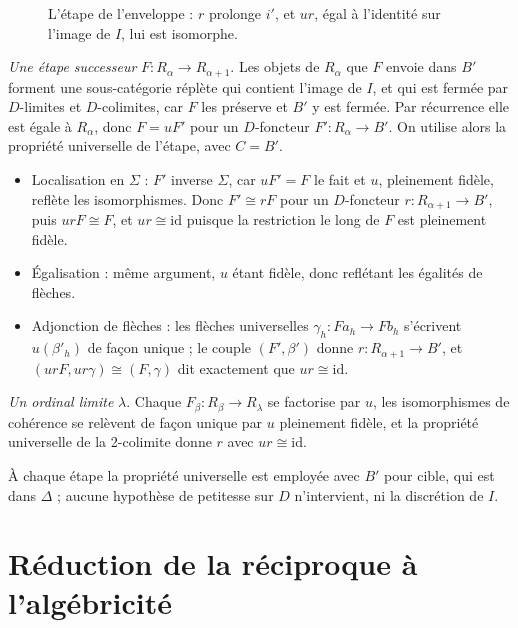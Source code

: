 \documentclass[11pt,a4paper]{amsart}
\theoremstyle{definition}
\theoremstyle{plain}
\theoremstyle{remark}
\newcommand{\It}{\widetilde I}
\begin{document}
\begin{figure}[htbp]
\centering
{}
\caption{L'étape de l'enveloppe : $r$ prolonge $i'$, et $ur$, égal à l'identité sur l'image de $I$, lui est isomorphe.}\label{fig:env}
\end{figure}

\emph{Une étape successeur} $F\colon R_\alpha\to R_{\alpha+1}$. Les objets de $R_\alpha$ que $F$ envoie dans $B'$ forment une sous-catégorie réplète qui contient l'image de $I$, et qui est fermée par $D$-limites et $D$-colimites, car $F$ les préserve et $B'$ y est fermée. Par récurrence elle est égale à $R_\alpha$, donc $F=uF'$ pour un $D$-foncteur $F'\colon R_\alpha\to B'$. On utilise alors la propriété universelle de l'étape, avec $C=B'$.
\begin{itemize}
\item Localisation en $\Sigma$ : $F'$ inverse $\Sigma$, car $uF'=F$ le fait et $u$, pleinement fidèle, reflète les isomorphismes. Donc $F'\cong rF$ pour un $D$-foncteur $r\colon R_{\alpha+1}\to B'$, puis $urF\cong F$, et $ur\cong\mathrm{id}$ puisque la restriction le long de $F$ est pleinement fidèle.
\item Égalisation : même argument, $u$ étant fidèle, donc reflétant les égalités de flèches.
\item Adjonction de flèches : les flèches universelles $\gamma_h\colon Fa_h\to Fb_h$ s'écrivent $u(\beta'_h)$ de façon unique ; le couple $(F',\beta')$ donne $r\colon R_{\alpha+1}\to B'$, et $(urF,ur\gamma)\cong(F,\gamma)$ dit exactement que $ur\cong\mathrm{id}$.
\end{itemize}

\emph{Un ordinal limite} $\lambda$. Chaque $F_\beta\colon R_\beta\to R_\lambda$ se factorise par $u$, les isomorphismes de cohérence se relèvent de façon unique par $u$ pleinement fidèle, et la propriété universelle de la 2-colimite donne $r$ avec $ur\cong\mathrm{id}$.

À chaque étape la propriété universelle est employée avec $B'$ pour cible, qui est dans $\Delta$ ; aucune hypothèse de petitesse sur $D$ n'intervient, ni la discrétion de $I$.

\section{Réduction de la réciproque à l'algébricité}\label{sec:red}
\end{document}
